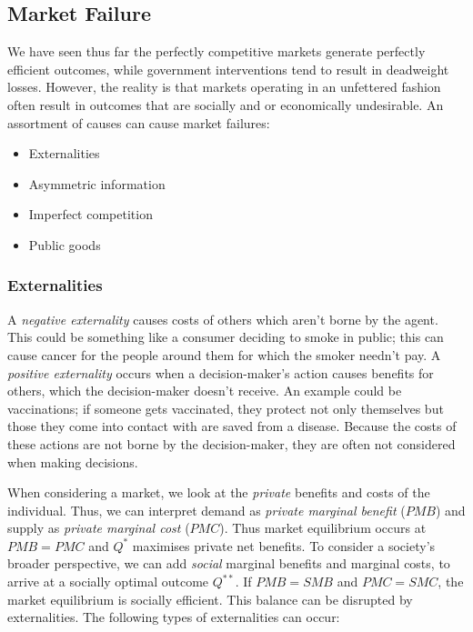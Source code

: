 \documentclass[12pt]{report}
\begin{document}
\subsection*{Market Failure}
We have seen thus far the perfectly competitive markets generate perfectly
efficient outcomes, while government interventions tend to result in 
deadweight losses. However, the reality is that markets operating in an
unfettered fashion often result in outcomes that are socially and or economically
undesirable. An assortment of causes can cause market failures:

\begin{itemize}
    \item Externalities
    \item Asymmetric information
    \item Imperfect competition
    \item Public goods
\end{itemize}

\subsubsection*{Externalities}

A \textit{negative externality} causes costs of others which aren't borne
by the agent. This could be something like a consumer deciding
to smoke in public; this can cause cancer for the people around them for
which the smoker needn't pay. A \textit{positive externality} occurs when
a decision-maker's action causes benefits for others, which the decision-maker
doesn't receive. An example could be vaccinations; if someone gets vaccinated,
they protect not only themselves but those they come into contact with are
saved from a disease. Because the costs of these actions are not borne
by the decision-maker, they are often not considered when making decisions.

\bigskip
When considering a market, we look at the \textit{private} benefits and 
costs of the individual. Thus, we can interpret demand as \textit{private
marginal benefit} (\(PMB\)) and supply as \textit{private marginal cost}
(\(PMC\)). Thus market equilibrium occurs at \(PMB = PMC\) and \(Q^*\)
maximises private net benefits. To consider a society's broader perspective,
we can add \textit{social} marginal benefits and marginal costs, to arrive
at a socially optimal outcome \(Q^{**}\). If \(PMB = SMB\) and \(PMC = SMC\),
the market equilibrium is socially efficient. This balance can be disrupted
by externalities. The following types of externalities can occur:
\end{document}
